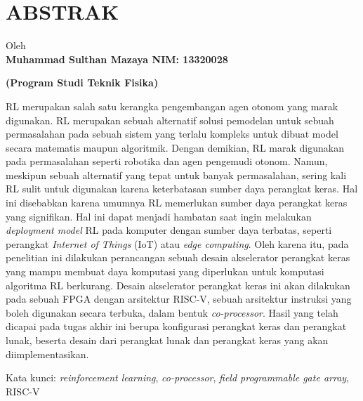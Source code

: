 \clearpage
\chapter*{ABSTRAK}

\begin{center}
	\begin{singlespace}
		\large\bfseries\MakeUppercase{\thetitle}
		
		\normalfont\normalsize
		
		Oleh\\
		\bfseries{Muhammad Sulthan Mazaya \hspace{5mm} NIM: 13320028}
		
		\vspace{5mm}
		\large\bfseries{(Program Studi Teknik Fisika)}
		\vspace{5mm}
		
	\end{singlespace}
\end{center}

\begin{singlespace}
	\small
	\acf{RL} merupakan salah satu kerangka pengembangan agen
	otonom yang marak digunakan. RL merupakan sebuah alternatif solusi pemodelan
	untuk sebuah permasalahan pada sebuah sistem yang terlalu kompleks untuk dibuat
	model secara matematis maupun algoritmik. Dengan demikian, RL marak
	digunakan pada permasalahan seperti robotika dan agen pengemudi otonom.
	Namun, meskipun sebuah alternatif yang tepat untuk banyak permasalahan, sering
	kali RL sulit untuk digunakan karena keterbatasan sumber daya perangkat keras.
	Hal ini disebabkan karena umumnya RL memerlukan sumber daya perangkat keras
	yang signifikan. Hal ini dapat menjadi hambatan saat ingin melakukan \textit{deployment
		model} RL pada komputer dengan sumber daya terbatas, seperti perangkat \textit{Internet
		of Things} (IoT) atau \textit{edge computing}. Oleh karena itu, pada penelitian ini dilakukan
	perancangan sebuah desain akselerator perangkat keras yang mampu membuat
	daya komputasi yang diperlukan untuk komputasi algoritma RL berkurang. Desain
	akselerator perangkat keras ini akan dilakukan pada sebuah \acf{FPGA}
	dengan arsitektur RISC-V, sebuah arsitektur instruksi yang boleh
	digunakan secara terbuka, dalam bentuk \textit{co-processor}. Hasil yang telah dicapai
	pada tugas akhir ini berupa konfigurasi perangkat keras dan perangkat lunak,
	beserta desain dari perangkat lunak dan perangkat keras yang akan
	diimplementasikan.
	
	Kata kunci: \textit{reinforcement learning}, \textit{co-processor}, \textit{field programmable gate array}, RISC-V
\end{singlespace}
\clearpage
